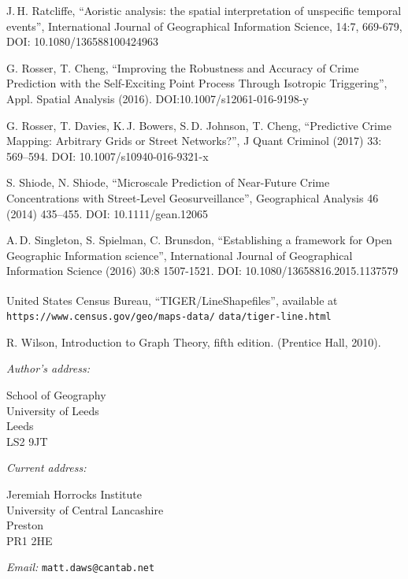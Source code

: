 \documentclass[twoside,a4paper,twocolumn,10pt]{article}
\theoremstyle{plain}
\theoremstyle{definition}
\newcommand{\regsym}{\textsuperscript{\textregistered}}
\begin{document}
\begin{thebibliography}{99}
 J.\,H. Ratcliffe, ``Aoristic analysis: the spatial interpretation of unspecific
temporal events'', International Journal of Geographical Information Science, 14:7, 669-679, DOI:
10.1080/136588100424963

 G. Rosser, T. Cheng, ``Improving the Robustness and Accuracy of Crime
   Prediction with the Self-Exciting Point Process Through Isotropic Triggering'',
   Appl. Spatial Analysis (2016). DOI:10.1007/s12061-016-9198-y

 G. Rosser, T. Davies, K.\,J. Bowers, S.\,D. Johnson, T. Cheng,
   ``Predictive Crime Mapping: Arbitrary Grids or Street Networks?'',
   J Quant Criminol (2017) 33: 569--594. DOI: 10.1007/s10940-016-9321-x

 S. Shiode, N. Shiode,
   ``Microscale Prediction of Near-Future Crime Concentrations with Street-Level Geosurveillance'',
   Geographical Analysis 46 (2014) 435--455.  DOI: 10.1111/gean.12065

 A.\,D. Singleton, S. Spielman, C. Brunsdon,
   ``Establishing a framework for Open Geographic Information science'',
   International Journal of Geographical Information Science (2016) 30:8 1507-1521.
   DOI: 10.1080/13658816.2015.1137579

 United States Census Bureau, ``TIGER/Line\regsym Shapefiles'',
   available at
   {\small\texttt{https://www.census.gov/geo/maps-data/}
   \texttt{data/tiger-line.html}}

 R. Wilson, Introduction to Graph Theory, fifth edition.
   (Prentice Hall, 2010).
   
\end{thebibliography}


\vspace{5ex}

\noindent\emph{Author's address:}
\parbox[t]{3in}{School of Geography\\
University of Leeds\\
Leeds\\
LS2 9JT}

\medskip

\noindent\emph{Current address:}
\parbox[t]{3in}{Jeremiah Horrocks Institute\\
University of Central Lancashire\\
Preston\\
PR1 2HE}

\bigskip\noindent\emph{Email:} \texttt{matt.daws@cantab.net}
\end{document}
